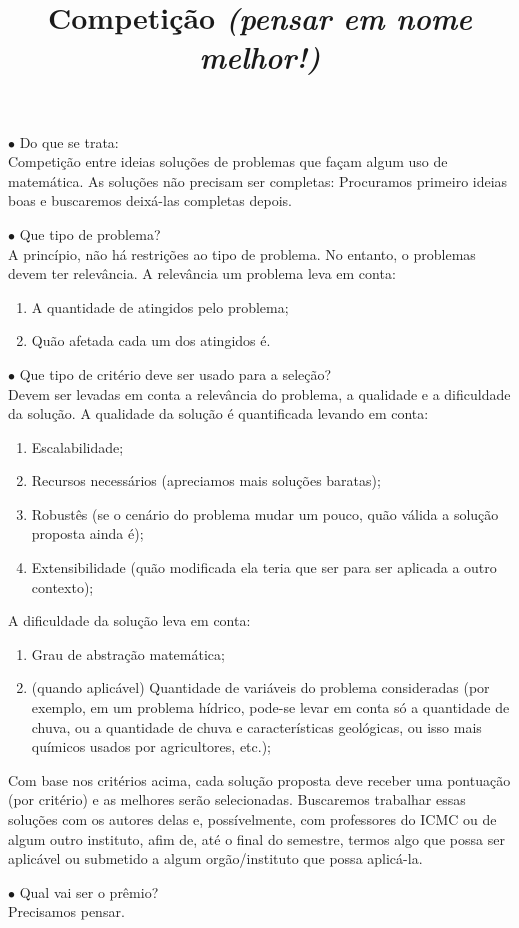 \documentclass{article}
\title{Competição \textit{(pensar em nome melhor!)}}
\begin{document}
\maketitle

  $\bullet$ Do que se trata:\\
  Competição entre ideias soluções de problemas que façam algum uso de matemática.
  As soluções não precisam ser completas: Procuramos primeiro ideias boas e buscaremos deixá-las completas depois.

  $\bullet$ Que tipo de problema?\\
  A princípio, não há restrições ao tipo de problema. No entanto, o problemas devem ter relevância.
  A relevância um problema leva em conta:
  \begin{enumerate}
      \item A quantidade de atingidos pelo problema;
      \item Quão afetada cada um dos atingidos é.
  \end{enumerate}

  $\bullet$ Que tipo de critério deve ser usado para a seleção?\\
  Devem ser levadas em conta a relevância do problema, a qualidade e a dificuldade da solução.
  A qualidade da solução é quantificada levando em conta:
  \begin{enumerate}
      \item Escalabilidade;
      \item Recursos necessários (apreciamos mais soluções baratas);
      \item Robustês (se o cenário do problema mudar um pouco, quão válida a solução proposta ainda é);
      \item Extensibilidade (quão modificada ela teria que ser para ser aplicada a outro contexto);
  \end{enumerate}
  A dificuldade da solução leva em conta:
  \begin{enumerate}
      \item Grau de abstração matemática;
      \item (quando aplicável) Quantidade de variáveis do problema consideradas (por exemplo, em um problema hídrico, pode-se levar em conta só a quantidade de chuva, ou a quantidade de chuva e características geológicas, ou isso mais químicos usados por agricultores, etc.);
  \end{enumerate}

Com base nos critérios acima, cada solução proposta deve receber uma pontuação (por critério) e as melhores serão selecionadas.
Buscaremos trabalhar essas soluções com os autores delas e, possívelmente, com professores do ICMC ou de algum outro instituto,
afim de, até o final do semestre, termos algo que possa ser aplicável ou submetido a algum orgão/instituto que possa aplicá-la.

  $\bullet$ Qual vai ser o prêmio?\\
  Precisamos pensar.
\end{document}
